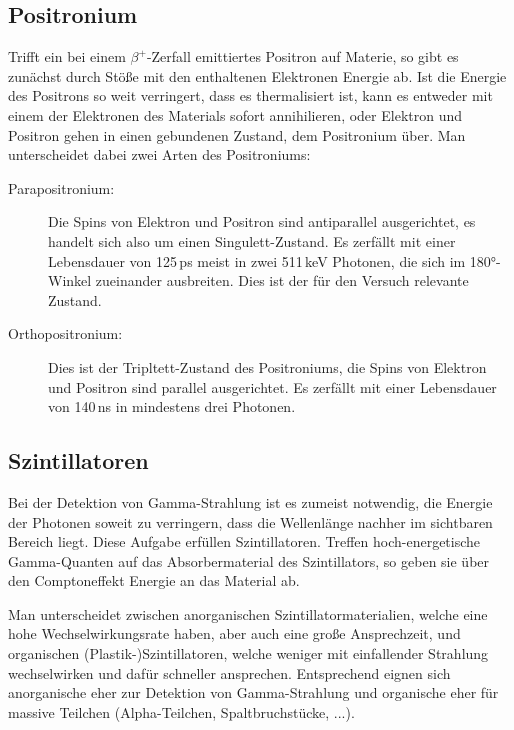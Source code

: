 \subsection{Positronium}

Trifft ein bei einem $\beta^+$-Zerfall emittiertes Positron auf Materie, so gibt es zunächst durch Stöße mit den enthaltenen Elektronen Energie ab. Ist die Energie des Positrons so weit verringert, dass es thermalisiert ist, kann es entweder mit einem der Elektronen des Materials sofort annihilieren, oder Elektron und Positron gehen in einen gebundenen Zustand, dem Positronium über. Man unterscheidet dabei zwei Arten des Positroniums:

\begin{description}
	\item[Parapositronium:]\hfill
	
	Die Spins von Elektron und Positron sind antiparallel ausgerichtet, es handelt sich also um einen Singulett-Zustand. Es zerfällt mit einer Lebensdauer von 125\,ps meist in zwei 511\,keV Photonen, die sich im 180°-Winkel zueinander ausbreiten. Dies ist der für den Versuch relevante Zustand.
	
	\item[Orthopositronium:]\hfill 
	
	Dies ist der Tripltett-Zustand des Positroniums, die Spins von Elektron und Positron sind parallel ausgerichtet. Es zerfällt mit einer Lebensdauer von 140\,ns in mindestens drei Photonen.
	
\end{description}

\subsection{Szintillatoren}

Bei der Detektion von Gamma-Strahlung ist es zumeist notwendig, die Energie der Photonen soweit zu verringern, dass die Wellenlänge nachher im sichtbaren Bereich liegt. Diese Aufgabe erfüllen Szintillatoren. Treffen hoch-energetische Gamma-Quanten auf das Absorbermaterial des Szintillators, so geben sie über den Comptoneffekt Energie an das Material ab. 

Man unterscheidet zwischen anorganischen Szintillatormaterialien, welche eine hohe Wechselwirkungsrate haben, aber auch eine große Ansprechzeit, und organischen (Plastik-)Szintillatoren, welche weniger mit einfallender Strahlung wechselwirken und dafür schneller ansprechen. Entsprechend eignen sich anorganische eher zur Detektion von Gamma-Strahlung und organische eher für massive Teilchen (Alpha-Teilchen, Spaltbruchstücke, ...). 

